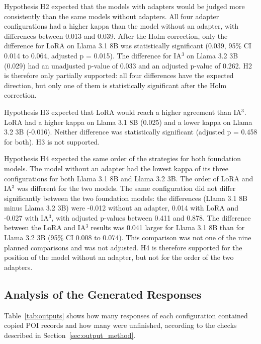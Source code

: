 \documentclass[journal,article,submit,pdftex,moreauthors]{Definitions/mdpi}
\begin{document}
Hypothesis H2 expected that the models with adapters would be judged more consistently than the same models without adapters. All four adapter configurations had a higher kappa than the model without an adapter, with differences between 0.013 and 0.039. After the Holm correction, only the difference for LoRA on Llama 3.1 8B was statistically significant (0.039, 95\% CI 0.014 to 0.064, adjusted p = 0.015). The difference for IA$^3$ on Llama 3.2 3B (0.029) had an unadjusted p-value of 0.033 and an adjusted p-value of 0.262. H2 is therefore only partially supported: all four differences have the expected direction, but only one of them is statistically significant after the Holm correction.

Hypothesis H3 expected that LoRA would reach a higher agreement than IA$^3$. LoRA had a higher kappa on Llama 3.1 8B (0.025) and a lower kappa on Llama 3.2 3B (-0.016). Neither difference was statistically significant (adjusted p = 0.458 for both). H3 is not supported.

Hypothesis H4 expected the same order of the strategies for both foundation models. The model without an adapter had the lowest kappa of its three configurations for both Llama 3.1 8B and Llama 3.2 3B. The order of LoRA and IA$^3$ was different for the two models. The same configuration did not differ significantly between the two foundation models: the differences (Llama 3.1 8B minus Llama 3.2 3B) were -0.012 without an adapter, 0.014 with LoRA and -0.027 with IA$^3$, with adjusted p-values between 0.411 and 0.878. The difference between the LoRA and IA$^3$ results was 0.041 larger for Llama 3.1 8B than for Llama 3.2 3B (95\% CI 0.008 to 0.074). This comparison was not one of the nine planned comparisons and was not adjusted. H4 is therefore supported for the position of the model without an adapter, but not for the order of the two adapters.

\subsection{Analysis of the Generated Responses}\label{sec:outputs}
Table~\ref{tab:outputs} shows how many responses of each configuration contained copied POI records and how many were unfinished, according to the checks described in Section~\ref{sec:output_method}.
\end{document}

